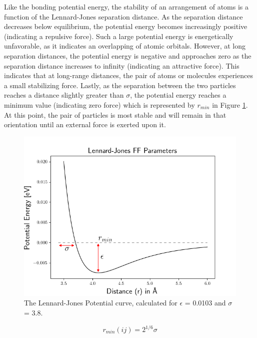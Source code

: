 Like the bonding potential energy, the stability of an arrangement of atoms is a function of the Lennard-Jones separation distance. As the separation distance decreases below equilibrium, the potential energy becomes increasingly positive (indicating a repulsive force). Such a large potential energy is energetically unfavorable, as it indicates an overlapping of atomic orbitals. However, at long separation distances, the potential energy is negative and approaches zero as the separation distance increases to infinity (indicating an attractive force). This indicates that at long-range distances, the pair of atoms or molecules experiences a small stabilizing force. Lastly, as the separation between the two particles reaches a distance slightly greater than $\sigma$, the potential energy reaches a minimum value (indicating zero force) which is represented by $r_{min}$ in Figure \ref{fig:LJ_parameters}. At this point, the pair of particles is most stable and will remain in that orientation until an external force is exerted upon it. 
\begin{figure}[h]
    \centering
    \includegraphics[scale=0.6]{Figures/Chapter2/LJ_2.png}
    \caption{The Lennard-Jones Potential curve, calculated for $\epsilon$ = 0.0103 and $\sigma$ = 3.8.}
    \label{fig:LJ_parameters}
\end{figure}
\begin{equation}
    r_{min}(ij)= 2^{1/6}\sigma
    \label{eq:r_min}
\end{equation}

